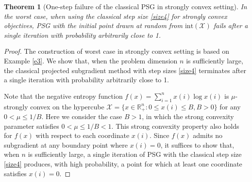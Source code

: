 \documentclass[sn-mathphys]{JORSC-jnl}%
\theoremstyle{thmstyleone}%
\newtheorem{theorem}{Theorem}[section]%
\theoremstyle{thmstylethree}%
\begin{document}
\begin{theorem}[One-step failure of the classical PSG in strongly convex setting]\label{thm2.2}
	In the worst case, when using the classical step size \eqref{size4} for strongly convex objectives, PSG with the initial point drawn at random from $\text{int}(\mathcal{X})$ fails after a single iteration with probability arbitrarily close to 1.
\end{theorem}
\begin{proof}
	The construction of worst case in strongly convex setting is based on Example \ref{e3}. We show that, when the problem dimension $n$ is sufficiently large, the classical projected subgradient method with step sizes \eqref{size4} terminates after a single iteration with probability arbitrarily close to 1.
	
	Note that the negative entropy function $f(x) = \sum_{i=1}^n x(i)\log x(i)$ is $\mu$-strongly convex on the hypercube $\mathcal{X} = \{ x \in \mathbb{R}_+^n : 0 \le x(i) \le B, B > 0 \}$ for any $0 < \mu \le 1/B$. Here we consider the case $B > 1$, in which the strong convexity parameter satisfies $0 < \mu \le 1/B < 1$. This strong convexity property also holds for $f(x)$ with respect to each coordinate $x(i)$. Since $f(x)$ admits no subgradient at any boundary point where $x(i)=0$, it suffices to show that, when $n$ is sufficiently large, a single iteration of PSG with the classical step size \eqref{size4} produces, with high probability, a point for which at least one coordinate satisfies $x(i)=0$.
	

\end{proof}
\end{document}
